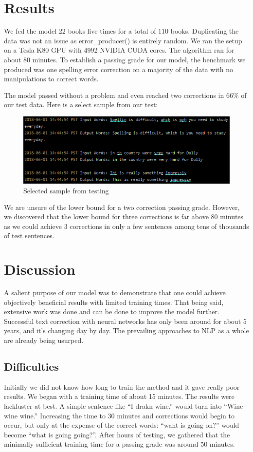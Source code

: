 \documentclass[11pt,a4paper]{scrartcl}
\theoremstyle{definition}
\begin{document}
\section{Results}
We fed the model 22 books five times for a total of 110 books. Duplicating the data was not an issue as error\_producer() is entirely random. We ran the setup on a Tesla K80 GPU with 4992 NVIDIA CUDA cores. The algorithm ran for about 80 minutes. To establish a passing grade for our model, the benchmark we produced was one spelling error correction on a majority of the data with no manipulations to correct words.\newline

The model passed without a problem and even reached two corrections in 66\% of our test data. Here is a select sample from our test:

\begin{figure}[!ht]
\centering
\includegraphics[scale=1]{results_1.png}
\caption{Selected sample from testing}
\label{figR1}
\end{figure}
\FloatBarrier

We are unsure of the lower bound for a two correction passing grade. However, we discovered that the lower bound for three corrections is far above 80 minutes as we could achieve 3 corrections in only a few sentences among tens of thousands of test sentences.

\section{Discussion}
A salient purpose of our model was to demonstrate that one could achieve objectively beneficial results with limited training times. That being said, extensive work was done and can be done to improve the model further. Successful text correction with neural networks has only been around for about 5 years, and it's changing day by day. The prevailing approaches to NLP as a whole are already being usurped.

\subsection{Difficulties}
Initially we did not know how long to train the method and it gave really poor results. We began with a training time of about 15 minutes. The results were lackluster at best. A simple sentence like “I drakn wine.” would turn into “Wine wine wine.” Increasing the time to 30 minutes and corrections would begin to occur, but only at the expense of the correct words: “waht is going on?” would become “what is going going?”. After hours of testing, we gathered that the minimally sufficient training time for a passing grade was around 50 minutes. 
\end{document}
